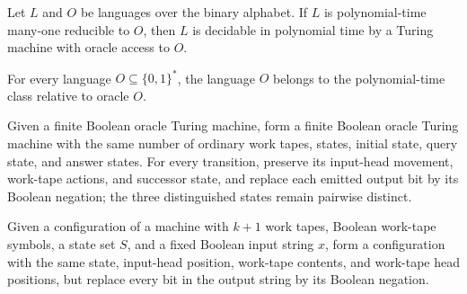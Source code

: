 \begin{theorem}
\label{Complexity.mem_POracle_of_polyTimeReducible}
\leanok
{}
Let $L$ and $O$ be languages over the binary alphabet. If $L$ is polynomial-time
many-one reducible to $O$, then $L$ is decidable in polynomial time by a Turing machine
with oracle access to $O$.
\end{theorem}

\begin{theorem}
\label{Complexity.oracle_mem_POracle}
\leanok
{}
For every language $O\subseteq\{0,1\}^*$, the language $O$ belongs to the
polynomial-time class relative to oracle $O$.
\end{theorem}

\begin{definition}
\label{Complexity.negOut}
\leanok
{}
Given a finite Boolean oracle Turing machine, form a finite Boolean oracle Turing
machine with the same number of ordinary work tapes, states, initial state, query state,
and answer states. For every transition, preserve its input-head movement, work-tape
actions, and successor state, and replace each emitted output bit by its Boolean
negation; the three distinguished states remain pairwise distinct.
\end{definition}

\begin{definition}
\label{Complexity.negCfg}
\leanok
{}
Given a configuration of a machine with $k+1$ work tapes, Boolean work-tape symbols, a
state set $S$, and a fixed Boolean input string $x$, form a configuration with the same
state, input-head position, work-tape contents, and work-tape head positions, but
replace every bit in the output string by its Boolean negation.
\end{definition}

